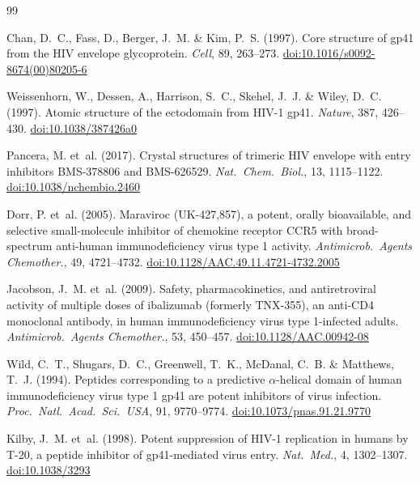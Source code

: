 \documentclass[11pt,a4paper]{article}
\begin{document}
\begin{thebibliography}{99}

Chan, D.~C., Fass, D., Berger, J.~M. \& Kim, P.~S. (1997).
\newblock Core structure of gp41 from the HIV envelope glycoprotein.
\newblock \textit{Cell}, 89, 263--273.
\newblock \href{https://doi.org/10.1016/s0092-8674(00)80205-6}{doi:10.1016/s0092-8674(00)80205-6}

Weissenhorn, W., Dessen, A., Harrison, S.~C., Skehel, J.~J. \& Wiley, D.~C. (1997).
\newblock Atomic structure of the ectodomain from HIV-1 gp41.
\newblock \textit{Nature}, 387, 426--430.
\newblock \href{https://doi.org/10.1038/387426a0}{doi:10.1038/387426a0}

Pancera, M. et~al. (2017).
\newblock Crystal structures of trimeric HIV envelope with entry inhibitors BMS-378806 and BMS-626529.
\newblock \textit{Nat.\ Chem.\ Biol.}, 13, 1115--1122.
\newblock \href{https://doi.org/10.1038/nchembio.2460}{doi:10.1038/nchembio.2460}

Dorr, P. et~al. (2005).
\newblock Maraviroc (UK-427,857), a potent, orally bioavailable, and selective small-molecule inhibitor of chemokine receptor CCR5 with broad-spectrum anti-human immunodeficiency virus type 1 activity.
\newblock \textit{Antimicrob.\ Agents Chemother.}, 49, 4721--4732.
\newblock \href{https://doi.org/10.1128/AAC.49.11.4721-4732.2005}{doi:10.1128/AAC.49.11.4721-4732.2005}

Jacobson, J.~M. et~al. (2009).
\newblock Safety, pharmacokinetics, and antiretroviral activity of multiple doses of ibalizumab (formerly TNX-355), an anti-CD4 monoclonal antibody, in human immunodeficiency virus type 1-infected adults.
\newblock \textit{Antimicrob.\ Agents Chemother.}, 53, 450--457.
\newblock \href{https://doi.org/10.1128/AAC.00942-08}{doi:10.1128/AAC.00942-08}

Wild, C.~T., Shugars, D.~C., Greenwell, T.~K., McDanal, C.~B. \& Matthews, T.~J. (1994).
\newblock Peptides corresponding to a predictive $\alpha$-helical domain of human immunodeficiency virus type 1 gp41 are potent inhibitors of virus infection.
\newblock \textit{Proc.\ Natl.\ Acad.\ Sci.\ USA}, 91, 9770--9774.
\newblock \href{https://doi.org/10.1073/pnas.91.21.9770}{doi:10.1073/pnas.91.21.9770}

Kilby, J.~M. et~al. (1998).
\newblock Potent suppression of HIV-1 replication in humans by T-20, a peptide inhibitor of gp41-mediated virus entry.
\newblock \textit{Nat.\ Med.}, 4, 1302--1307.
\newblock \href{https://doi.org/10.1038/3293}{doi:10.1038/3293}


\end{thebibliography}
\end{document}
